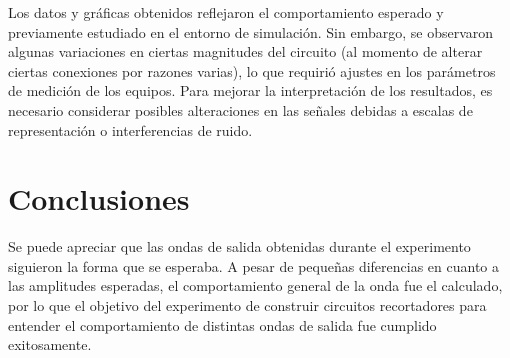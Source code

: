 \documentclass[journal]{IEEEtran}
\begin{document}
Los datos y gráficas obtenidos reflejaron el comportamiento esperado y previamente estudiado en el entorno de simulación. 
Sin embargo, se observaron algunas variaciones en ciertas magnitudes del circuito (al momento de alterar ciertas conexiones por razones varias), 
lo que requirió ajustes en los parámetros de medición de los equipos. 
Para mejorar la interpretación de los resultados, es necesario considerar posibles alteraciones en las señales debidas a escalas de 
representación o interferencias de ruido.

\section{Conclusiones}
Se puede apreciar que las ondas de salida obtenidas durante el experimento siguieron la forma que se esperaba. A pesar de pequeñas diferencias
en cuanto a las amplitudes esperadas, el comportamiento general de la onda fue el calculado, por lo que el objetivo del experimento de construir circuitos recortadores
para entender el comportamiento de distintas ondas de salida fue cumplido exitosamente.

\appendices
\end{document}

